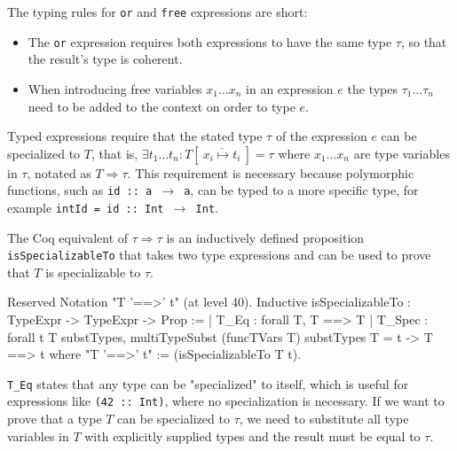 \documentclass[paper = a4, fleqn, abstract=on, twoside]{scrreprt}
\newcommand{\todo}[1]{\marginpar{\textbf{TODO:} #1}}
\newcommand{\coqinline}[1]{\texttt{#1}}
\begin{document}
\todo{Unterschiedliche Höhe...}\noindent
The typing rules for \texttt{or} and \texttt{free} expressions are short:
\begin{itemize}
	\item The \coqinline{or} expression requires both expressions to have the same type $\tau$, so that the result's type is coherent.
	\item When introducing free variables $x_1 \dots x_n$ in an expression $e$ the types $\tau_1 \dots \tau_n$ need to be added to the context on order to type $e$.
\end{itemize}
Typed expressions require that the stated type $\tau$ of the expression $e$ can be specialized to $T$, that is, $\exists t_1 \dots t_n: T[~\overline{x_i \mapsto t_i}~] = \tau$ where $x_1 \dots x_n$ are type variables in $\tau$, notated as $T \Rightarrow \tau$. This requirement is necessary because polymorphic functions, such as \texttt{id :: a $\rightarrow$ a}, can be typed to a more specific type, for example \mbox{\texttt{intId = id :: Int $\rightarrow$ Int}}.
\par
The Coq equivalent of $\tau \Rightarrow \tau$ is an inductively defined proposition \coqinline{isSpecializableTo} that takes two type expressions and can be used to prove that $T$ is specializable to $\tau$.
\begin{coqcode}
Reserved Notation "T '==>' t" (at level 40).
Inductive isSpecializableTo : TypeExpr -> TypeExpr -> Prop :=
  | T_Eq   : forall T, T  ==> T
  | T_Spec : forall t T substTypes,
               multiTypeSubst (funcTVars T) substTypes T = t ->
               T ==> t
where "T '==>' t" := (isSpecializableTo T t).
\end{coqcode}
\coqinline{T_Eq} states that any type can be "specialized" to itself, which is useful for expressions like \texttt{(42 :: Int)}, where no specialization is necessary. If we want to prove that a type $T$ can be specialized to $\tau$, we need to substitute all type variables in $T$ with explicitly supplied types and the result must be equal to $\tau$.
\end{document}
